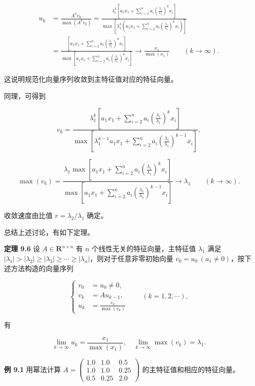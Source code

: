 \documentclass[
  10pt,
  fontset=fandol]{ctexart}
\begin{document}
\[
\begin{aligned}
u_k&=\frac{A^kv_0}{\max(A^kv_0)}
=\frac{\lambda_i^k\left[a_1x_1+\displaystyle\sum_{i=2}^na_i\left(\frac{\lambda_i}{\lambda_1}\right)^kx_i\right]}{\max\left[\lambda_1^k\left(a_1x_1+\displaystyle\sum_{i=2}^na_i\left(\frac{\lambda_i}{\lambda_1}\right)^kx_i\right)\right]}\\
&=\frac{\left[a_1x_1+\displaystyle\sum_{i=2}^na_i\left(\frac{\lambda_i}{\lambda_1}\right)^kx_i\right]}{\max\left[a_1x_1+\displaystyle\sum_{i=2}^na_i\left(\frac{\lambda_i}{\lambda_1}\right)^kx_i\right]}
\to\frac{x_1}{\max(x_1)}\qquad(k\to\infty).
\end{aligned}
\]

这说明规范化向量序列收敛到主特征值对应的特征向量。

同理，可得到

\[
v_k=\frac{\lambda_1^k\left[a_1x_1+\displaystyle\sum_{i=2}^na_i\left(\frac{\lambda_i}{\lambda_1}\right)^kx_i\right]}{\max\left[\lambda_1^{k-1}a_1x_1+\displaystyle\sum_{i=2}^na_i\left(\frac{\lambda_i}{\lambda_1}\right)^{k-1}x_i\right]},
\]

\[
\max(v_k)=\frac{\lambda_1\max\left[a_1x_1+\displaystyle\sum_{i=2}^na_i\left(\frac{\lambda_i}{\lambda_1}\right)^kx_i\right]}{\max\left[a_1x_1+\displaystyle\sum_{i=2}^na_i\left(\frac{\lambda_i}{\lambda_1}\right)^{k-1}x_i\right]}\to\lambda_1\qquad(k\to\infty).
\]

收敛速度由比值 \(r=\lambda_2/\lambda_1\) 确定。

总结上述讨论，有如下定理。

\textbf{定理 9.6} 设 \(A\in\mathbf R^{n\times n}\) 有 \(n\) 个线性无关的特征向量，主特征值 \(\lambda_1\) 满足 \(|\lambda_1|>|\lambda_2|\geq|\lambda_3|\geq\cdots\geq|\lambda_n|\)，则对于任意非零初始向量 \(v_0=u_0\ (a_1\ne0)\)，按下述方法构造的向量序列

\[
\left\{
\begin{aligned}
v_0&=u_0\ne0,\\
v_k&=Au_{k-1},\\
u_k&=\frac{v_k}{\max(v_k)}
\end{aligned}
\right.\qquad(k=1,2,\cdots),
\tag{9.2.9}
\]

有

\[
\lim_{k\to\infty}u_k=\frac{x_1}{\max(x_1)},\quad\lim_{k\to\infty}\max(v_k)=\lambda_1.
\]

\textbf{例 9.1} 用幂法计算 \(A=\begin{pmatrix}1.0&1.0&0.5\\1.0&1.0&0.25\\0.5&0.25&2.0\end{pmatrix}\) 的主特征值和相应的特征向量。
\end{document}
